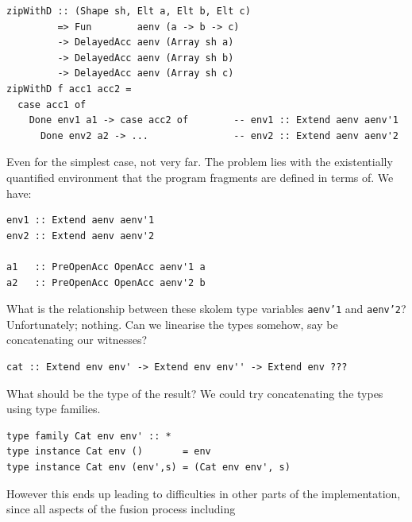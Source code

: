 %
%
%
\begin{lstlisting}[style=haskell]
zipWithD :: (Shape sh, Elt a, Elt b, Elt c)
         => Fun        aenv (a -> b -> c)
         -> DelayedAcc aenv (Array sh a)
         -> DelayedAcc aenv (Array sh b)
         -> DelayedAcc aenv (Array sh c)
zipWithD f acc1 acc2 =
  case acc1 of
    Done env1 a1 -> case acc2 of        -- env1 :: Extend aenv aenv'1
      Done env2 a2 -> ...               -- env2 :: Extend aenv aenv'2
\end{lstlisting}
%
Even for the simplest case, not very far. The problem lies with the
existentially quantified environment that the program fragments are defined in
terms of. We have:
%
\begin{lstlisting}[style=haskell]
env1 :: Extend aenv aenv'1
env2 :: Extend aenv aenv'2

a1   :: PreOpenAcc OpenAcc aenv'1 a
a2   :: PreOpenAcc OpenAcc aenv'2 b
\end{lstlisting}
%
What is the relationship between these skolem type variables \texttt{aenv'1} and
\texttt{aenv'2}? Unfortunately; nothing. Can we linearise the types somehow, say
be concatenating our witnesses?
%
%
\begin{lstlisting}[style=haskell]
cat :: Extend env env' -> Extend env env'' -> Extend env ???
\end{lstlisting}
%
What should be the type of the result? We could try concatenating the types
using type families.
%
\begin{lstlisting}[style=haskell]
type family Cat env env' :: *
type instance Cat env ()       = env
type instance Cat env (env',s) = (Cat env env', s)
\end{lstlisting}
%
However this ends up leading to difficulties in other parts of the
implementation, since all aspects of the fusion process including
